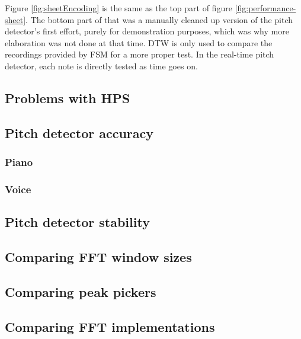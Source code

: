 Figure \ref{fig:sheetEncoding} is the same as the top part of figure \ref{fig:performance-sheet}. The bottom part of that was a manually cleaned up version of the pitch detector's first effort, purely for demonstration purposes, which was why more elaboration was not done at that time. DTW is only used to compare the recordings provided by FSM for a more proper test. In the real-time pitch detector, each note is directly tested as time goes on.



\subsection{Problems with HPS}

\subsection{Pitch detector accuracy}
\subsubsection{Piano}
\subsubsection{Voice}
\subsection{Pitch detector stability}
\subsection{Comparing FFT window sizes}
\subsection{Comparing peak pickers}
\subsection{Comparing FFT implementations}